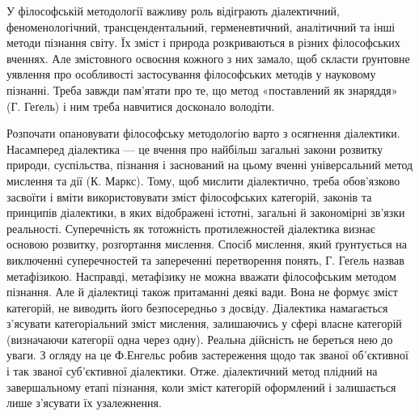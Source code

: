 У філософській методології важливу роль відіграють діалектичний,
феноменологічний, трансцендентальний, герменевтичний, аналітичний та інші
методи пізнання світу. Їх зміст і природа розкриваються в різних філософських
вченнях. Але змістовного освоєння кожного з них замало, щоб скласти
ґрунтовне уявлення про особливості застосування філософських методів у
науковому пізнанні. Треба завжди пам’ятати про те, що метод «поставлений як
знаряддя» (Г. Геґель) і ним треба навчитися досконало володіти.

Розпочати опановувати філософську методологію варто з осягнення
діалектики. Насамперед діалектика --- це вчення про найбільш загальні закони
розвитку природи, суспільства, пізнання і заснований на цьому вченні
універсальний метод мислення та дії (К. Маркс). Тому, щоб мислити
діалектично, треба обов’язково засвоїти і вміти використовувати зміст
філософських категорій, законів та принципів діалектики, в яких відображені
істотні, загальні й закономірні зв’язки реальності. Суперечність як тотожність
протилежностей діалектика визнає основою розвитку, розгортання мислення.
Спосіб мислення, який ґрунтується на виключенні суперечностей та
запереченні перетворення понять, Г. Геґель назвав метафізикою. Насправді,
метафізику не можна вважати філософським методом пізнання. Але й
діалектиці також притаманні деякі вади. Вона не формує зміст категорій, не
виводить його безпосередньо з досвіду. Діалектика намагається з’ясувати
категоріальний зміст мислення, залишаючись у сфері власне категорій
(визначаючи категорії одна через одну). Реальна дійсність не береться нею до
уваги. З огляду на це Ф.Енгельс робив застереження щодо так званої
об’єктивної і так званої суб’єктивної діалектики. Отже. діалектичний метод
плідний на завершальному етапі пізнання, коли зміст категорій оформлений і
залишається лише з’ясувати їх узалежнення.

